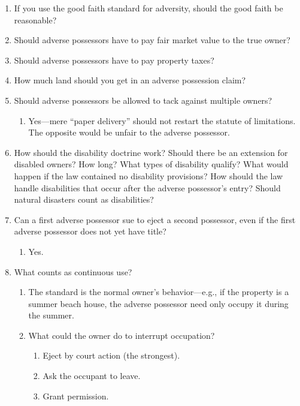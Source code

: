 \begin{enumerate}
\begin{enumerate}
        \item If you use the good faith standard for adversity, should the 
        good faith be reasonable?
        \item Should adverse possessors have to pay fair market value to the 
        true owner?
        \item Should adverse possessors have to pay property taxes?
        \item How much land should you get in an adverse possession claim?
        \item Should adverse possessors be allowed to tack against multiple 
        owners?
        \begin{enumerate}
            \item Yes---mere ``paper delivery'' should not restart the statute 
            of limitations. The opposite would be unfair to the adverse 
            possessor.
        \end{enumerate}
        \item How should the disability doctrine work? Should there be an 
        extension for disabled owners? How long? What types of disability 
        qualify? What would happen if the law contained no disability 
        provisions? How should the law handle disabilities that occur after the 
        adverse possessor's entry? Should natural disasters count as 
        disabilities?
        \item Can a first adverse possessor sue to eject a second possessor, 
        even if the first adverse possessor does not yet have title?
        \begin{enumerate}
            \item Yes.
        \end{enumerate}
        \item What counts as continuous use?
        \begin{enumerate}
            \item The standard is the normal owner's behavior---e.g., if the 
            property is a summer beach house, the adverse possessor need only 
            occupy it during the summer.
            \item What could the owner do to interrupt occupation?
            \begin{enumerate}
                \item Eject by court action (the strongest).
                \item Ask the occupant to leave.
                \item Grant permission.

\end{enumerate}
\end{enumerate}
\end{enumerate}
\end{enumerate}
